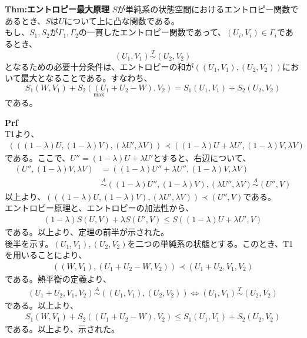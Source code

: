 \documentclass[a4paper,11pt]{jsarticle}
\numberwithin{equation}{section}
\begin{document}
\begin{itembox}[l]{\textbf{Thm:エントロピー最大原理}}
    $S$が単純系の状態空間におけるエントロピー関数であるとき、$S$は$U$について上に凸な関数である。\\
    もし、$S_1,S_2$が$\Gamma_1,\Gamma_2$の一貫したエントロピー関数であって、$(U_i,V_i)\in \Gamma_i$であるとき、
    \begin{equation}
        (U_1,V_1) \overset{T}{\sim} (U_2,V_2) 
    \end{equation}
    となるための必要十分条件は、エントロピーの和が$((U_1,V_1),(U_2,V_2))$において最大となることである。すなわち、
    \begin{equation}
        \underset{\text{max}}{S_1(W,V_1)+S_2((U_1+U_2-W),V_2)} =S_1(U_1,V_1)+S_2(U_2,V_2)
    \end{equation}
    である。

\end{itembox}
\textbf{Prf}\\
T1より、
\begin{align}
    (((1-\lambda)U,(1-\lambda)V),(\lambda U',\lambda V)) \prec ((1-\lambda)U+\lambda U',(1-\lambda)V,\lambda V)
\end{align}
である。ここで、$U'' = (1-\lambda)U+\lambda U'$とすると、右辺について、
\begin{align}
    (U'',(1-\lambda)V,\lambda V) &=((1-\lambda)U''+\lambda U'',(1-\lambda)V,\lambda V)\\
    & \overset{A}{\sim} ((1-\lambda)U'',(1-\lambda)V),(\lambda U'',\lambda V) \overset{A}{\sim} (U'',V)
\end{align}
以上より、$    (((1-\lambda)U,(1-\lambda)V),(\lambda U',\lambda V)) \prec (U'',V)$である。\\
エントロピー原理と、エントロピーの加法性から、
\begin{align}
    (1-\lambda)S(U,V)+\lambda S(U',V) \leq S((1-\lambda)U+\lambda U',V)
\end{align}
である。以上より、定理の前半が示された。\\
後半を示す。$(U_1,V_1),(U_2,V_2)$を二つの単純系の状態とする。このとき、T1を用いることにより、
\begin{align}
    ((W,V_1),(U_1+U_2-W,V_2)) \prec (U_1+U_2,V_1,V_2)
\end{align}
である。熱平衡の定義より、
\begin{align}
(U_1+U_2,V_1,V_2) \overset{A}{\sim} ((U_1,V_1),(U_2,V_2)) \Leftrightarrow (U_1,V_1) \overset{T}{\sim} (U_2,V_2)
\end{align}
である。以上より、
\begin{align}
    S_1(W,V_1)+S_2((U_1+U_2-W),V_2) \leq S_1(U_1,V_1)+S_2(U_2,V_2)
\end{align}
である。以上より、示された。\hfill\qedsymbol\\
\end{document}
